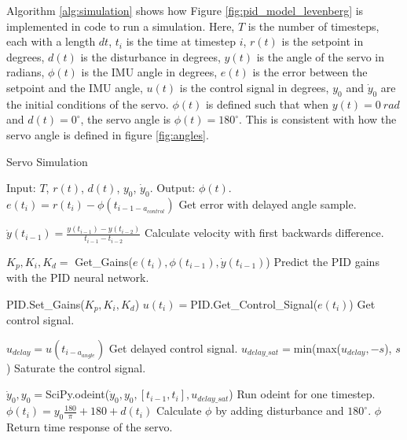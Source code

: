 \documentclass[letterpaper,12pt]{article}
\newcommand{\degrees}{^\circ}
\begin{document}
Algorithm \ref{alg:simulation} shows how Figure \ref{fig:pid_model_levenberg} is implemented in code to run a simulation. Here, $T$ is the number of timesteps, each with a length $dt$, $t_i$ is the time at timestep $i$, $r(t)$ is the setpoint in degrees, $d(t)$ is the disturbance in degrees, $y(t)$ is the angle of the servo in radians, $\phi(t)$ is the IMU angle in degrees, $e(t)$ is the error between the setpoint and the IMU angle, $u(t)$ is the control signal in degrees, $y_0$ and $\dot y_0$ are the initial conditions of the servo. $\phi(t)$ is defined such that when $y(t) = \SI{0}{rad}$ and $d(t) = 0\degrees$, the servo angle is $\phi(t)=180\degrees$. This is consistent with how the servo angle is defined in figure \ref{fig:angles}.

\begin{algorithm}
	\caption{Servo Simulation}\label{alg:simulation}
	\begin{algorithmic}[1]
		\State Input: $T$, $r(t)$, $d(t)$, $y_0$, $\dot y_0$.
		\State Output: $\phi(t)$.
			\State $e(t_i) = r(t_i) - \phi(t_{i-1-a_{control}})$
			\Comment Get error with delayed angle sample.

			\State $\dot y (t_{i-1}) =\frac{y(t_{i-1}) - y(t_{i-2})}{t_{i-1} - t_{i-2}}$
			\Comment Calculate velocity with first backwards difference.

			\State $K_p, K_i, K_d =$ Get\_Gains($e(t_i), \phi(t_{i-1}), \dot y(t_{i-1})$)
			\Comment Predict the PID gains with the PID neural network.

			\State PID.Set\_Gains($K_p, K_i, K_d$)
			\State $u(t_i) = $PID.Get\_Control\_Signal($e(t_i)$)
			\Comment Get control signal.

			\State $u_{delay} = u(t_{i-a_{angle}})$
			\Comment Get delayed control signal.
			\State $u_{delay\_sat} = $min(max($u_{delay}, -s$), $s$)
			\Comment Saturate the control signal.

			\State $\dot y_0, y_0 = $SciPy.odeint($\dot y_0, y_0, [t_{i-1}, t_i], u_{delay\_sat}$)
			\Comment Run odeint for one timestep.
			\State $\phi(t_i) = y_0 \frac{180}{\pi} + 180 + d(t_i)$
			\Comment Calculate $\phi$ by adding disturbance and $180 \degrees$.
		\EndFor
		\State \Return $\phi$
		\Comment Return time response of the servo.
	\end{algorithmic}
\end{algorithm}
\end{document}
